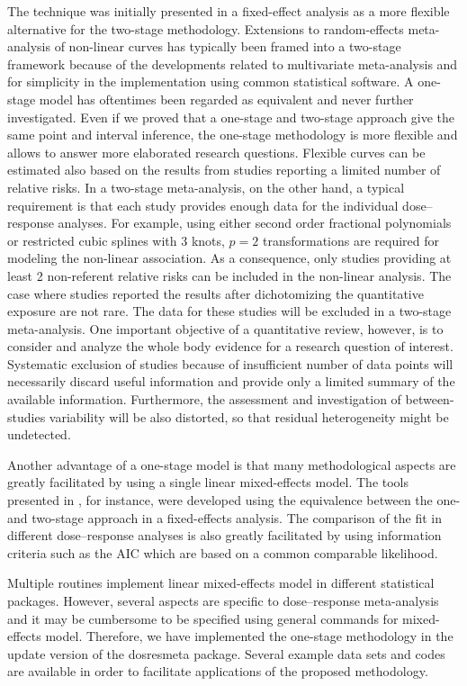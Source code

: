 \documentclass[11pt,a4paper,twoside,openany]{book}\usepackage{knitr}
\newcommand{\pkg}[1]{{\fontseries{b}\selectfont #1}}
\begin{document}
{The technique was initially presented in a fixed-effect analysis as a more flexible alternative for the two-stage methodology. Extensions to random-effects meta-analysis of non-linear curves has typically been framed into a two-stage framework because of the developments related to multivariate meta-analysis and for simplicity in the implementation using common statistical software.  A one-stage model has oftentimes been regarded as equivalent and never further investigated. Even if we proved that a one-stage and two-stage approach give the same point and interval inference, the one-stage methodology is more flexible and allows to answer more elaborated research questions. Flexible curves can be estimated also based on the results from studies reporting a limited number of relative risks. In a two-stage meta-analysis, on the other hand, a typical requirement is that each study provides enough data for the individual dose--response analyses. For example, using either second order fractional polynomials or restricted cubic splines with 3 knots, $p = 2$ transformations are required for modeling the non-linear association. As a consequence, only studies providing at least 2 non-referent relative risks can be included in the non-linear analysis. The case where studies reported the results after dichotomizing the quantitative exposure are not rare. The data for these studies will be excluded in a two-stage meta-analysis. One important objective of a quantitative review, however, is to consider and analyze the whole body evidence for a research question of interest. Systematic exclusion of studies because of insufficient number of data points will necessarily discard useful information and provide only a limited summary of the available information. Furthermore, the assessment and investigation of between-studies variability will be also distorted, so that residual heterogeneity might be undetected. 

Another advantage of a one-stage model is that many methodological aspects are greatly facilitated by using a single linear mixed-effects model. The tools presented in , for instance, were developed using the equivalence between the one- and two-stage approach in a fixed-effects analysis. The comparison of the fit in different dose--response analyses is also greatly facilitated by using information criteria such as the AIC which are based on a common comparable likelihood.

Multiple routines implement linear mixed-effects model in different statistical packages. However, several aspects are specific to dose--response meta-analysis and it may be cumbersome to be specified using general commands for mixed-effects model. Therefore, we have implemented the one-stage methodology in the update version of the \pkg{dosresmeta} package. Several example data sets and codes are available in order to facilitate applications of the proposed methodology.

}
\end{document}
